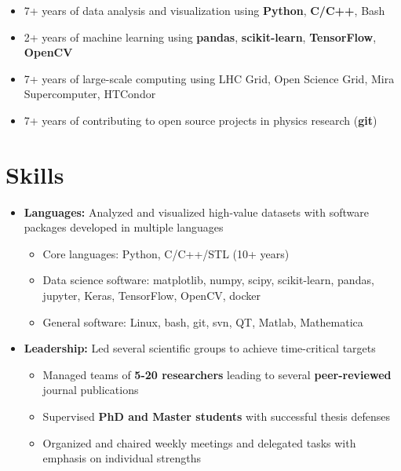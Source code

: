 \documentclass{myfancycv}
\begin{document}
{\begin{itemize}\setlength\itemindent{-2.2em}
\item 7+ years of data analysis and visualization using {\bf Python}, {\bf C/C++}, Bash
\item 2+ years of machine learning using {\bf pandas}, {\bf scikit-learn}, {\bf TensorFlow}, {\bf OpenCV}
\item 7+ years of large-scale computing using LHC Grid, Open Science Grid, Mira Supercomputer, HTCondor
\item 7+ years of contributing to open source projects in physics research  ({\bf git})
\end{itemize}

\section{Skills}
\begin{itemize}

\item {\textbf{Languages:} Analyzed and visualized high-value datasets with software packages developed in multiple languages
{\begin{itemize}\setlength\itemindent{-2.2em}
\item Core languages: Python, C/C++/STL (10+ years)
\item Data science software: matplotlib, numpy, scipy, scikit-learn, pandas, jupyter, Keras, TensorFlow, OpenCV, docker
\item General software: Linux, bash, git, svn, QT, Matlab, Mathematica
\end{itemize}
}
}

\vspace{6pt}

\item {\textbf{Leadership:} Led several scientific groups to achieve time-critical targets
{\begin{itemize}\setlength\itemindent{-2.2em}
    \item Managed teams of {\bf5-20 researchers} leading to several {\bf peer-reviewed} journal publications
    \item Supervised {\bf PhD and Master students} with successful thesis defenses
    \item Organized and chaired weekly meetings and delegated tasks with emphasis on individual strengths


\end{itemize}}%
}


\end{itemize}}
\end{document}
